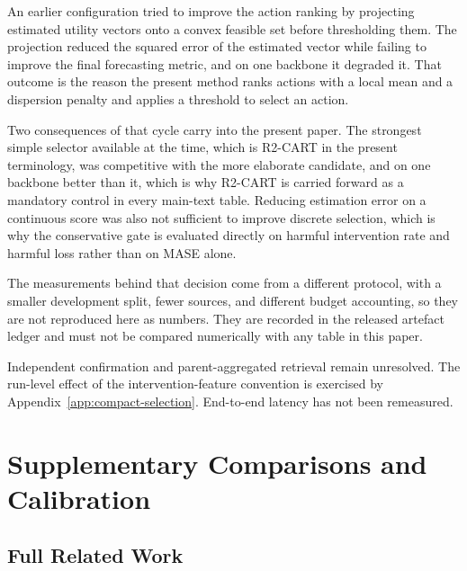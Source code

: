 \documentclass{article}
\begin{document}
An earlier configuration tried to improve the action ranking by projecting estimated utility
vectors onto a convex feasible set before thresholding them. The projection reduced the squared
error of the estimated vector while failing to improve the final forecasting metric, and on one
backbone it degraded it. That outcome is the reason the present method ranks actions with a
local mean and a dispersion penalty and applies a threshold to select an action.

Two consequences of that cycle carry into the present paper. The strongest simple selector
available at the time, which is R2-CART in the present terminology, was competitive with the
more elaborate candidate, and on one backbone better than it, which is why R2-CART is carried
forward as a mandatory control in every main-text table. Reducing estimation error on a
continuous score was also not sufficient to improve discrete selection, which is why the
conservative gate is evaluated directly on harmful intervention rate and harmful loss rather
than on MASE alone.

The measurements behind that decision come from a different protocol, with a smaller
development split, fewer sources, and different budget accounting, so they are not reproduced
here as numbers. They are recorded in the released artefact ledger and must not be compared
numerically with any table in this paper.

Independent confirmation and parent-aggregated retrieval remain unresolved. The run-level
effect of the intervention-feature convention is exercised by
Appendix~\ref{app:compact-selection}. End-to-end latency has not been remeasured.


\section{Supplementary Comparisons and Calibration}
\label{app:layout-details}
\subsection{Full Related Work}
\label{sec:related}
\end{document}
